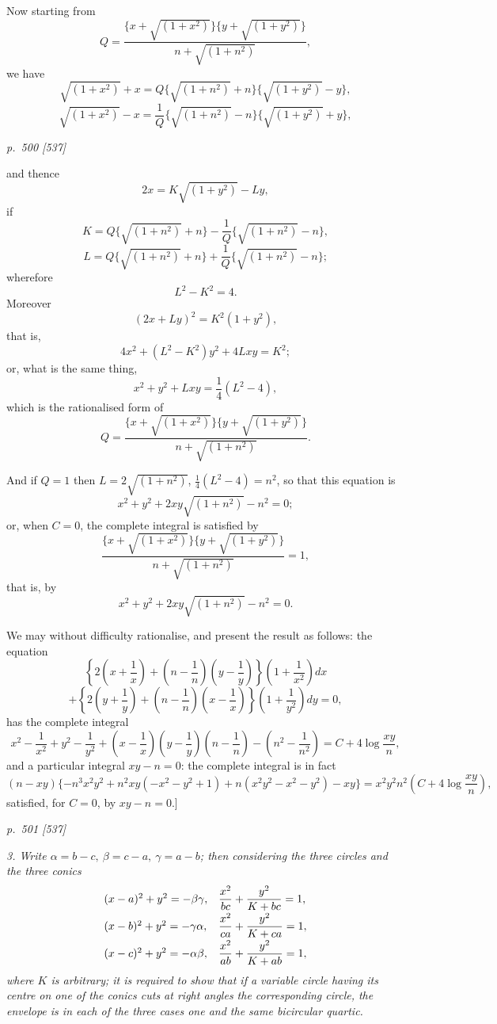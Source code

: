 \documentclass[11pt,a4paper]{article}
\theoremstyle{plain}
\theoremstyle{definition}
\newcommand{\sqr}[1]{\sqrt{(#1)}}
\begin{document}
Now starting from
\[
Q=\frac{\{x+\sqr{1+x^2}\}\{y+\sqr{1+y^2}\}}{n+\sqr{1+n^2}},
\]
we have
\[
\sqr{1+x^2}+x=Q\{\sqr{1+n^2}+n\}\{\sqr{1+y^2}-y\},
\]
\[
\sqr{1+x^2}-x=\frac{1}{Q}\{\sqr{1+n^2}-n\}\{\sqr{1+y^2}+y\},
\]
\clearpage

\bigskip
\textit{p.~500 [537]}
\smallskip

\noindent

and thence
\[
2x=K\sqr{1+y^2}-Ly,
\]
if
\[
K=Q\{\sqr{1+n^2}+n\}-\frac{1}{Q}\{\sqr{1+n^2}-n\},
\]
\[
L=Q\{\sqr{1+n^2}+n\}+\frac{1}{Q}\{\sqr{1+n^2}-n\};
\]
wherefore
\[
L^2-K^2=4.
\]
Moreover
\[
(2x+Ly)^2=K^2(1+y^2),
\]
that is,
\[
4x^2+(L^2-K^2)y^2+4Lxy=K^2;
\]
or, what is the same thing,
\[
x^2+y^2+Lxy=\frac{1}{4}(L^2-4),
\]
which is the rationalised form of
\[
Q=\frac{\{x+\sqr{1+x^2}\}\{y+\sqr{1+y^2}\}}{n+\sqr{1+n^2}}.
\]

And if \(Q=1\) then \(L=2\sqr{1+n^2}\), \(\frac{1}{4}(L^2-4)=n^2\), so that this equation is
\[
x^2+y^2+2xy\sqr{1+n^2}-n^2=0;
\]
or, when \(C=0\), the complete integral is satisfied by
\[
\frac{\{x+\sqr{1+x^2}\}\{y+\sqr{1+y^2}\}}{n+\sqr{1+n^2}}=1,
\]
that is, by
\[
x^2+y^2+2xy\sqr{1+n^2}-n^2=0.
\]

We may without difficulty rationalise, and present the result as follows: the equation
\[
\left\{2\left(x+\frac{1}{x}\right)+\left(n-\frac{1}{n}\right)
\left(y-\frac{1}{y}\right)\right\}
\left(1+\frac{1}{x^2}\right)dx
\]
\[
+\left\{2\left(y+\frac{1}{y}\right)+\left(n-\frac{1}{n}\right)
\left(x-\frac{1}{x}\right)\right\}
\left(1+\frac{1}{y^2}\right)dy=0,
\]
has the complete integral
\[
x^2-\frac{1}{x^2}+y^2-\frac{1}{y^2}
+\left(x-\frac{1}{x}\right)\left(y-\frac{1}{y}\right)
\left(n-\frac{1}{n}\right)-\left(n^2-\frac{1}{n^2}\right)
=C+4\log\frac{xy}{n},
\]
and a particular integral \(xy-n=0\): the complete integral is in fact
\[
(n-xy)\{-n^3x^2y^2+n^2xy(-x^2-y^2+1)
+n(x^2y^2-x^2-y^2)-xy\}
=x^2y^2n^2\left(C+4\log\frac{xy}{n}\right),
\]
satisfied, for \(C=0\), by \(xy-n=0\).]

\clearpage

\bigskip
\textit{p.~501 [537]}
\smallskip


\noindent\textit{3. Write $\alpha=b-c,\ \beta=c-a,\ \gamma=a-b$; then considering the three circles and the three conics}
\[
\begin{array}{ll}
(x-a)^2+y^2=-\beta\gamma, & \displaystyle {x^2\over bc}+{y^2\over K+bc}=1,\\[6pt]
(x-b)^2+y^2=-\gamma\alpha, & \displaystyle {x^2\over ca}+{y^2\over K+ca}=1,\\[6pt]
(x-c)^2+y^2=-\alpha\beta, & \displaystyle {x^2\over ab}+{y^2\over K+ab}=1,
\end{array}
\]
\textit{where $K$ is arbitrary; it is required to show that if a variable circle having its centre on one of the conics cuts at right angles the corresponding circle, the envelope is in each of the three cases one and the same bicircular quartic.}
\end{document}
